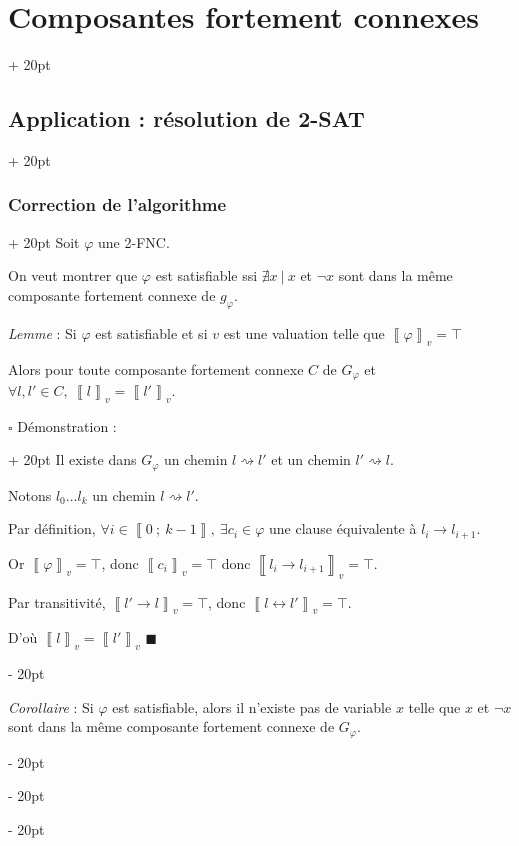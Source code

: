 \documentclass[a4paper, 12pt, twoside]{article}
\newcommand{\nset}[2]{\left\llbracket #1\ ;\ #2 \right\rrbracket}
\newcommand{\lrbb}[1]{\left\llbracket #1 \right\rrbracket}
\newcommand{\ind}[1][20pt]{\advance\leftskip + #1}
\newcommand{\deind}[1][20pt]{\advance\leftskip - #1}
\newenvironment{indt}[2][20pt]{#2 \par \ind[#1]}{\par \deind} %
\newenvironment{proof}[1][{Démonstration :}]{\begin{indt}{$\square$ #1}}{$\blacksquare$ \end{indt}}
\begin{document}
\begin{indt}{\section{Composantes fortement connexes}}
\begin{indt}{\subsection{Application : résolution de 2-SAT}}
            \vspace{12pt}
            
            \begin{indt}{\subsubsection{Correction de l'algorithme}}
                Soit $\varphi$ une 2-FNC.

                On veut montrer que $\varphi$ est satisfiable ssi $\nexists x\ |\ x$ et $\neg x$ sont dans la même composante fortement connexe de $g_\varphi$.

                \begin{pseudocode}
                    \textit{Lemme} :
                    Si $\varphi$ est satisfiable et si $v$ est une valuation telle que $\lrbb{\varphi}_v = \top$

                    Alors pour toute composante fortement connexe $C$ de $G_\varphi$ et $\forall l, l' \in C,\ \lrbb l_v = \lrbb{l'}_v$.
                \end{pseudocode}

                \begin{proof}
                    Il existe dans $G_\varphi$ un chemin $l \rightsquigarrow l'$ et un chemin $l' \rightsquigarrow l$.

                    Notons $l_0 \ldots l_k$ un chemin $l \rightsquigarrow l'$.

                    Par définition, $\forall i \in \nset 0 {k - 1},\ \exists c_i \in \varphi$ une clause équivalente à $l_i \rightarrow l_{i + 1}$.

                    Or $\lrbb \varphi _v = \top$, donc $\lrbb{c_i}_v = \top$ donc $\lrbb{l_i \rightarrow l_{i + 1}}_v = \top$.

                    Par transitivité, $\lrbb{l' \rightarrow l}_v = \top$, donc $\lrbb{l \leftrightarrow l'}_v = \top$.

                    D'où $\lrbb l _v = \lrbb{l'}_v$
                \end{proof}

                \vspace{12pt}
                
                \begin{pseudocode}
                    \textit{Corollaire} :
                    Si $\varphi$ est satisfiable, alors il n'existe pas de variable $x$ telle que $x$ et $\neg x$ sont dans la même composante fortement connexe de $G_\varphi$.
                \end{pseudocode}


\end{indt}
\end{indt}
\end{indt}
\end{document}
